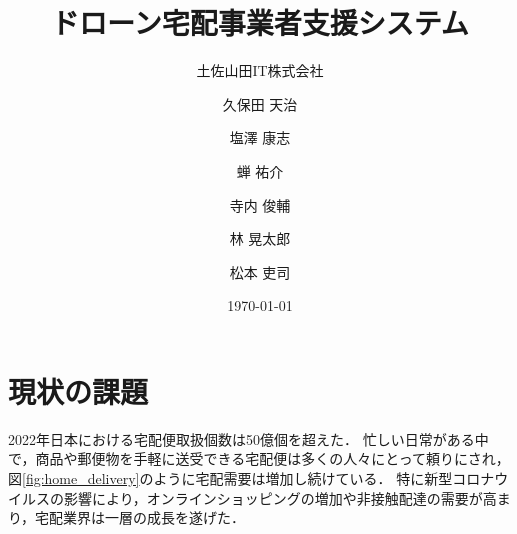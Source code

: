 \documentclass[a4paper, titlepage]{jsarticle}
\date{\today}
\title{ドローン宅配事業者支援システム}
\author{土佐山田IT株式会社 \and
        久保田 天治 \and 塩澤 康志 \and 蝉 祐介 \and 寺内 俊輔 \and 林 晃太郎 \and 松本 吏司}
\begin{document}
\maketitle

\tableofcontents

\clearpage

\section{現状の課題}
2022年日本における宅配便取扱個数は50億個を超えた．
忙しい日常がある中で，商品や郵便物を手軽に送受できる宅配便は多くの人々にとって頼りにされ，図\ref{fig:home_delivery}のように宅配需要は増加し続けている．
特に新型コロナウイルスの影響により，オンラインショッピングの増加や非接触配達の需要が高まり，宅配業界は一層の成長を遂げた．
\end{document}
